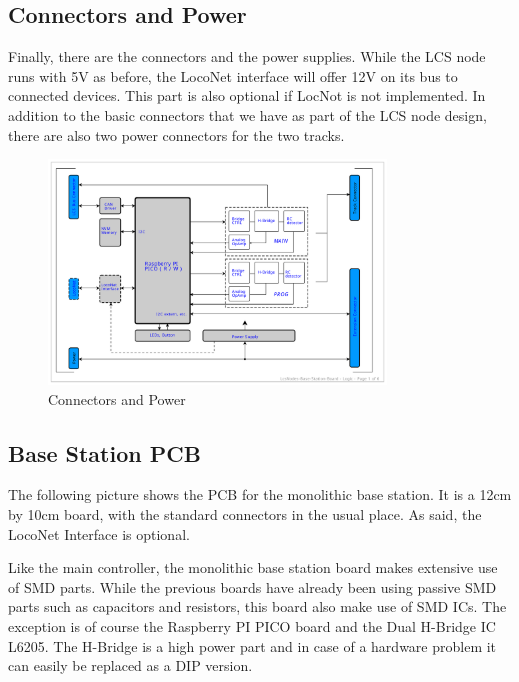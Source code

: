 \subsection{ Connectors and Power}

Finally, there are the connectors and the power supplies. While the LCS node runs with 5V as before, the LocoNet interface will offer 12V on its bus to connected devices. This part is also optional if LocNot is not implemented. In addition to the basic connectors that we have as part of the LCS node design, there are also two power connectors for the two tracks.

\begin{figure}[htbp]
    \centering
    \includegraphics[page=6, width=0.8\textwidth]{./Schematics/Schematic_LcsNodes-Base-Station-Board.pdf}
    \caption{Connectors and Power}
\end{figure}
\FloatBarrier

\subsection{Base Station PCB}

The following picture shows the PCB for the monolithic base station. It is a 12cm by 10cm board, with the standard connectors in the usual place. As said, the LocoNet Interface is optional. 


Like the main controller, the monolithic base station board makes extensive use of SMD parts. While the previous boards have already been using passive SMD parts such as capacitors and resistors, this board also make use of SMD ICs. The exception is of course the Raspberry PI PICO board and the Dual H-Bridge IC L6205. The H-Bridge is a high power part and in case of a hardware problem it can easily be replaced as a DIP version.

